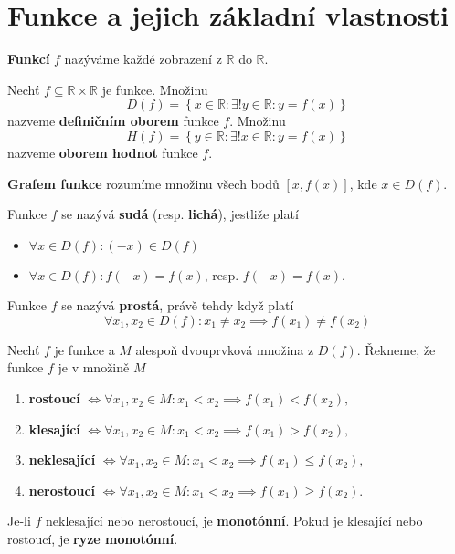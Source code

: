 \section{Funkce a jejich základní vlastnosti}
\begin{definition}
  \textbf{Funkcí} $f$ nazýváme každé zobrazení z $\mathbb R$ do $\mathbb R$.
\end{definition}

\begin{definition}
  Nechť $f\subseteq \mathbb R \times \mathbb R$ je funkce. Množinu
  \[
    D(f) = \left  \{ x \in \mathbb R:\exists ! y \in \mathbb R:y=f(x) \right \}
  \]
  nazveme \textbf{definičním oborem} funkce $f$. Množinu
  \[
    H(f) = \left  \{ y \in \mathbb R:\exists ! x \in \mathbb R:y=f(x) \right \}
  \]
  nazveme \textbf{oborem hodnot} funkce $f$.
\end{definition}

\begin{pozn}
  \textbf{Grafem funkce} rozumíme množinu všech bodů $[x,f(x)]$, kde $x\in D(f).$
\end{pozn}


\begin{definition}
  Funkce $f$ se nazývá \textbf{sudá} (resp. \textbf{lichá}), jestliže platí
\begin{itemize}
  \item
  $\forall x \in D(f):(-x) \in D(f)$
\item
 $\forall x \in D(f): f(-x)=f(x)$, resp. $f(-x)=f(x)$.
\end{itemize}

\end{definition}

\begin{definition}
  Funkce $f$ se nazývá \textbf{prostá}, právě tehdy když platí
  \[
    \forall x_1,x_2\in D(f): x_1\ne x_2 \implies f(x_1)\ne f(x_2)
  \]
\end{definition}

\begin{definition}
  Nechť $f$ je funkce a $M$ alespoň dvouprvková množina z $D(f)$. Řekneme, že funkce $f$ je v množině $M$
  \begin{enumerate}[$i.$]
    \item \textbf{rostoucí} $\iff \forall x_1, x_2 \in M: x_1 < x_2 \implies f(x_1) < f(x_2),$
    \item \textbf{klesající} $\iff \forall x_1, x_2 \in M: x_1 < x_2 \implies f(x_1) > f(x_2),$
    \item \textbf{neklesající} $\iff \forall x_1, x_2 \in M: x_1 < x_2 \implies f(x_1) \leq f(x_2),$
    \item \textbf{nerostoucí} $\iff \forall x_1, x_2 \in M: x_1 < x_2 \implies f(x_1) \geq f(x_2).$
  \end{enumerate}
  Je-li $f$ neklesající nebo nerostoucí, je \textbf{monotónní}. Pokud je klesající nebo rostoucí, je \textbf{ryze monotónní}.
\end{definition}

